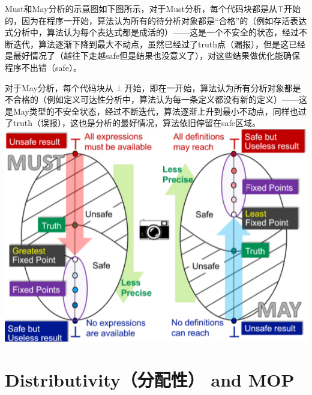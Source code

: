 \documentclass[a4paper]{article}
\theoremstyle{definition}
\begin{document}
Must和May分析的示意图如下图所示，对于Must分析，每个代码块都是从$\top$开始的，因为在程序一开始，算法认为所有的待分析对象都是“合格”的（例如存活表达式分析中，算法认为每个表达式都是成活的）——这是一个不安全的状态，经过不断迭代，算法逐渐下降到最大不动点，虽然已经过了truth点（漏报），但是这已经是最好情况了（越往下走越safe但是结果也没意义了），对这些结果做优化能确保程序不出错（safe）。

对于May分析，每个代码块从$\perp$开始，即在一开始，算法认为所有分析对象都是不合格的（例如定义可达性分析中，算法认为每一条定义都没有新的定义）——这是May类型的不安全状态，经过不断迭代，算法逐渐上升到最小不动点，同样也过了truth（误报），这也是分析的最好情况，算法依旧停留在safe区域。
\includegraphics{img/Snipaste_2021-06-04_16-39-05.png}

\section{Distributivity（分配性） and MOP}
\end{document}
